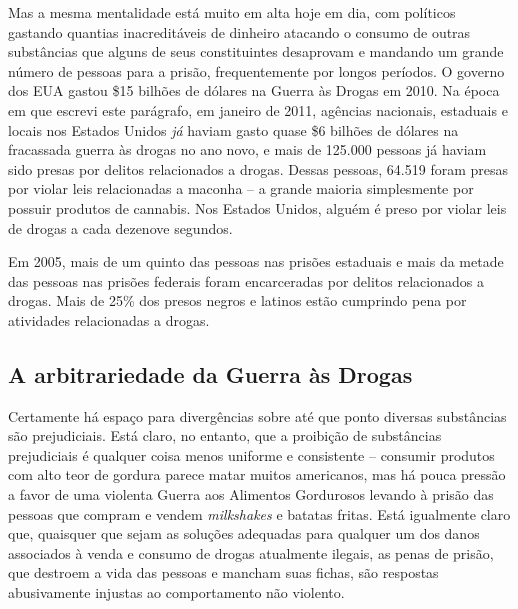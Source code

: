 Mas a mesma mentalidade está muito em alta hoje em dia, com políticos gastando quantias inacreditáveis de dinheiro atacando o consumo de outras substâncias que alguns de seus constituintes desaprovam e mandando um grande número de pessoas para a prisão, frequentemente por longos períodos. O governo dos EUA gastou \$15 bilhões de dólares na Guerra às Drogas em 2010. Na época em que escrevi este parágrafo, em janeiro de 2011, agências nacionais, estaduais e locais nos Estados Unidos \emph{já} haviam gasto quase \$6 bilhões de dólares na fracassada guerra às drogas no ano novo, e mais de 125.000 pessoas já haviam sido presas por delitos relacionados a drogas. Dessas pessoas, 64.519 foram presas por violar leis relacionadas a maconha -- a grande maioria simplesmente por possuir produtos de cannabis. Nos Estados Unidos, alguém é preso por violar leis de drogas a cada dezenove segundos.

Em 2005, mais de um quinto das pessoas nas prisões estaduais e mais da metade das pessoas nas prisões federais foram encarceradas por delitos relacionados a drogas. Mais de 25\% dos presos negros e latinos estão cumprindo pena por atividades relacionadas a drogas.

\subsection*{A arbitrariedade da Guerra às Drogas}

Certamente há espaço para divergências sobre até que ponto diversas substâncias são prejudiciais. Está claro, no entanto, que a proibição de substâncias prejudiciais é qualquer coisa menos uniforme e consistente -- consumir produtos com alto teor de gordura parece matar muitos americanos, mas há pouca pressão a favor de uma violenta Guerra aos Alimentos Gordurosos levando à prisão das pessoas que compram e vendem \emph{milkshakes} e batatas fritas. Está igualmente claro que, quaisquer que sejam as soluções adequadas para qualquer um dos danos associados à venda e consumo de drogas atualmente ilegais, as penas de prisão, que destroem a vida das pessoas e mancham suas fichas, são respostas abusivamente injustas ao comportamento não violento.


